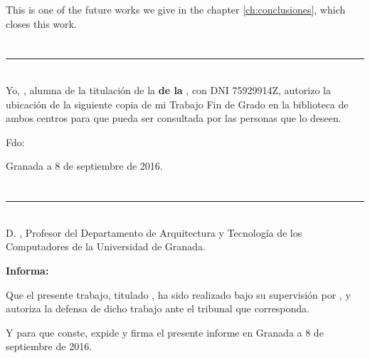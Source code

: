 This is one of the future works we give in the chapter \ref{ch:conclusiones}, which closes this work.

\chapter*{}
\thispagestyle{empty}

\noindent\rule[-1ex]{\textwidth}{2pt}\\[4.5ex]

Yo, \textbf{\myName}, alumna de la titulación \myDegree  de la \textbf{\myFaculty  de la \myUni}, con DNI 75929914Z, autorizo la
ubicación de la siguiente copia de mi Trabajo Fin de Grado en la biblioteca de ambos centros para que pueda ser
consultada por las personas que lo deseen.

\vspace{6cm}

\noindent Fdo: \myName

\vspace{2cm}

\begin{flushright}
Granada a 8 de septiembre de 2016.
\end{flushright}


\chapter*{}
\thispagestyle{empty}

\noindent\rule[-1ex]{\textwidth}{2pt}\\[4.5ex]

D. \textbf{ \myProf }, Profesor del Departamento de Arquitectura y Tecnología de los Computadores de la Universidad de Granada.

\vspace{0.5cm}


\textbf{Informa:}

\vspace{0.5cm}

Que el presente trabajo, titulado \textit{\textbf{\myTitle}},
ha sido realizado bajo su supervisión por \textbf{\myName}, y autoriza la defensa de dicho trabajo ante el tribunal
que corresponda.

\vspace{0.5cm}

Y para que conste, expide y firma el presente informe en Granada a 8 de septiembre de 2016.

\vspace{1cm}

